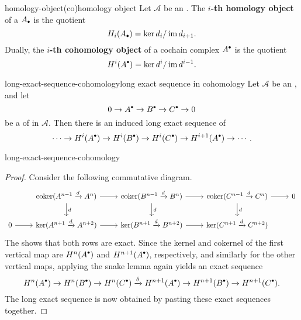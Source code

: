 \begin{topic}{homology-object}{(co)homology object}
    Let $\mathcal{A}$ be an . The \textbf{$i$-th homology object} of a  $A_\bdot$ is the quotient
    \[ H_i(A_\bdot) = \ker d_i / \im d_{i + 1} . \]
    Dually, the \textbf{$i$-th cohomology object} of a cochain complex $A^\bdot$ is the quotient
    \[ H^i(A^\bdot) = \ker d^i / \im d^{i - 1} . \]
\end{topic}

\begin{topic}{long-exact-sequence-cohomology}{long exact sequence in cohomology}
    Let $\mathcal{A}$ be an , and let
    \[ 0 \rightarrow A^\bdot \rightarrow B^\bdot \rightarrow C^\bdot \rightarrow 0 \]
    be a  of  in $\mathcal{A}$. Then there is an induced long exact sequence of 
    \[ \cdots \rightarrow H^i(A^\bdot) \rightarrow H^i(B^\bdot) \rightarrow H^i(C^\bdot) \rightarrow H^{i + 1}(A^\bdot) \rightarrow \cdots . \]
\end{topic}

\begin{example}{long-exact-sequence-cohomology}
\begin{proof}
    Consider the following commutative diagram.
    \[ \begin{tikzcd}
        & \coker(A^{n - 1} \xrightarrow{d} A^n) \arrow{r} \arrow{d}{d} & \coker(B^{n - 1} \xrightarrow{d} B^n) \arrow{r} \arrow{d}{d} & \coker(C^{n - 1} \xrightarrow{d} C^n) \arrow{r} \arrow{d}{d} & 0 \\
        0 \arrow{r} & \ker(A^{n + 1} \xrightarrow{d} A^{n + 2}) \arrow{r} & \ker(B^{n + 1} \xrightarrow{d} B^{n + 2}) \arrow{r} & \ker(C^{n + 1} \xrightarrow{d} C^{n + 2}) &
    \end{tikzcd} \]
    The  shows that both rows are exact. Since the kernel and cokernel of the first vertical map are $H^n(A^\bdot)$ and $H^{n + 1}(A^\bdot)$, respectively, and similarly for the other vertical maps, applying the snake lemma again yields an exact sequence
    \[ H^n(A^\bdot) \to H^n(B^\bdot) \to H^n(C^\bdot) \xrightarrow{\delta} H^{n + 1}(A^\bdot) \to H^{n + 1}(B^\bdot) \to H^{n + 1}(C^\bdot) . \]
    The long exact sequence is now obtained by pasting these exact sequences together.
\end{proof}
\end{example}

